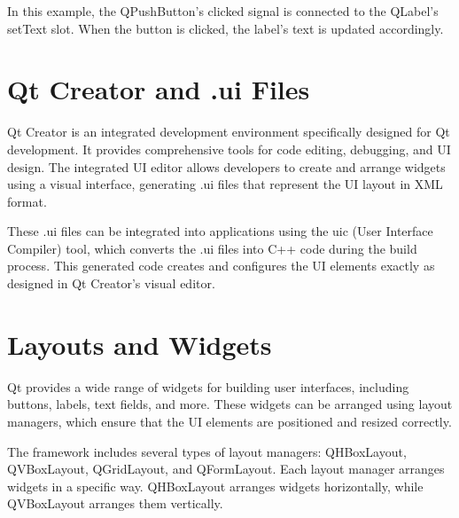 In this example, the QPushButton's clicked signal is connected to the QLabel's setText slot.
When the button is clicked, the label's text is updated accordingly.

\section{Qt Creator and .ui Files}
Qt Creator is an integrated development environment specifically designed for Qt development.
It provides comprehensive tools for code editing, debugging, and UI design. The integrated UI editor
allows developers to create and arrange widgets using a visual interface, generating .ui files that
represent the UI layout in XML format.

These .ui files can be integrated into applications using the uic (User Interface Compiler)
tool, which converts the .ui files into C++ code during the build process. This generated code
creates and configures the UI elements exactly as designed in Qt Creator's visual editor.

\section{Layouts and Widgets}
Qt provides a wide range of widgets for building user interfaces, including buttons, labels,
text fields, and more. These widgets can be arranged using layout managers, which ensure that
the UI elements are positioned and resized correctly.

The framework includes several types of layout managers: QHBoxLayout, QVBoxLayout, QGridLayout,
and QFormLayout. Each layout manager arranges widgets in a specific way. QHBoxLayout
arranges widgets horizontally, while QVBoxLayout arranges them vertically.

